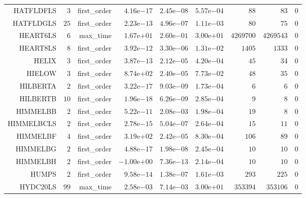 \begin{longtable}{rrrrrrrrr}
HATFLDFLS & \(     3\) & first\_order & \( 4.16\)e\(-17\) & \( 2.45\)e\(-08\) & \( 5.57\)e\(-04\) & \(    88\) & \(    83\) & \(     0\) \\
HATFLDGLS & \(    25\) & first\_order & \( 2.23\)e\(-13\) & \( 4.96\)e\(-07\) & \( 1.11\)e\(-03\) & \(    80\) & \(    75\) & \(     0\) \\
HEART6LS & \(     6\) & max\_time & \( 1.67\)e\(+01\) & \( 2.60\)e\(-01\) & \( 3.00\)e\(+01\) & \(4269700\) & \(4269543\) & \(     0\) \\
HEART8LS & \(     8\) & first\_order & \( 3.92\)e\(-12\) & \( 3.30\)e\(-06\) & \( 1.31\)e\(-02\) & \(  1405\) & \(  1333\) & \(     0\) \\
HELIX & \(     3\) & first\_order & \( 3.87\)e\(-13\) & \( 2.12\)e\(-05\) & \( 4.20\)e\(-04\) & \(    45\) & \(    34\) & \(     0\) \\
HIELOW & \(     3\) & first\_order & \( 8.74\)e\(+02\) & \( 2.40\)e\(-05\) & \( 7.73\)e\(-02\) & \(    48\) & \(    35\) & \(     0\) \\
HILBERTA & \(     2\) & first\_order & \( 3.22\)e\(-17\) & \( 9.03\)e\(-09\) & \( 1.73\)e\(-04\) & \(     6\) & \(     6\) & \(     0\) \\
HILBERTB & \(    10\) & first\_order & \( 1.96\)e\(-18\) & \( 6.26\)e\(-09\) & \( 2.85\)e\(-04\) & \(     9\) & \(     8\) & \(     0\) \\
HIMMELBB & \(     2\) & first\_order & \( 5.22\)e\(-11\) & \( 2.08\)e\(-03\) & \( 1.98\)e\(-04\) & \(    19\) & \(     8\) & \(     0\) \\
HIMMELBCLS & \(     2\) & first\_order & \( 2.78\)e\(-15\) & \( 5.04\)e\(-07\) & \( 2.64\)e\(-04\) & \(    15\) & \(    11\) & \(     0\) \\
HIMMELBF & \(     4\) & first\_order & \( 3.19\)e\(+02\) & \( 2.42\)e\(-05\) & \( 8.30\)e\(-04\) & \(   106\) & \(    89\) & \(     0\) \\
HIMMELBG & \(     2\) & first\_order & \( 4.88\)e\(-17\) & \( 1.98\)e\(-08\) & \( 2.45\)e\(-04\) & \(    10\) & \(    10\) & \(     0\) \\
HIMMELBH & \(     2\) & first\_order & \(-1.00\)e\(+00\) & \( 7.36\)e\(-13\) & \( 2.14\)e\(-04\) & \(    10\) & \(    10\) & \(     0\) \\
HUMPS & \(     2\) & first\_order & \( 9.58\)e\(-14\) & \( 1.38\)e\(-07\) & \( 1.61\)e\(-03\) & \(   293\) & \(   225\) & \(     0\) \\
HYDC20LS & \(    99\) & max\_time & \( 2.58\)e\(-03\) & \( 7.14\)e\(-03\) & \( 3.00\)e\(+01\) & \(353394\) & \(353106\) & \(     0\) \\

\end{longtable}
